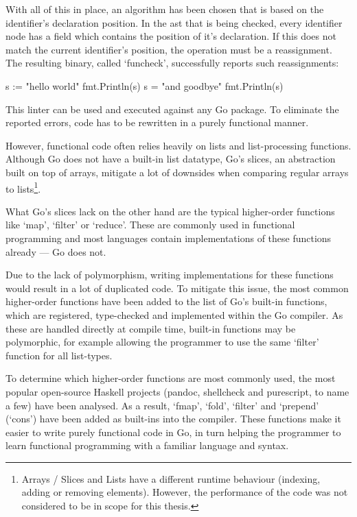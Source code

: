 With all of this in place, an algorithm has been chosen that is based on the identifier's
declaration position. In the \gls{ast} that is being checked, every identifier node has a field
which contains the position of it's declaration. If this does not match the current identifier's
position, the operation must be a reassignment.
The resulting binary, called `funcheck', successfully reports such reassignments:

\begin{gocode}
s := "hello world"
fmt.Println(s)
s = "and goodbye"
fmt.Println(s)
\end{gocode}


This linter can be used and executed against any Go package. To eliminate the reported errors,
code has to be rewritten in a purely functional manner.

However, functional code often relies heavily on lists and list-processing functions.
Although Go does not have a built-in list datatype, Go's slices, an abstraction built
on top of arrays,
mitigate a lot of downsides when comparing regular arrays to lists\footnote{Arrays / Slices
and Lists have a different runtime behaviour (indexing, adding or removing elements).
However, the performance of the code was not considered to be in scope for this thesis.}.

What Go's slices lack on the other hand are the typical higher-order functions like `map',
`filter' or `reduce'. These are commonly used in functional programming and most languages
contain implementations of these functions already --- Go does not.

Due to the lack of polymorphism, writing implementations for these functions
would result in a lot of duplicated code. To mitigate this issue, the most
common higher-order functions have been added to the list of Go's built-in functions,
which are registered, type-checked and implemented within the Go compiler.
As these are handled directly at compile time, built-in functions may be polymorphic, for
example allowing the programmer to use the same `filter' function for all list-types.

To determine which higher-order functions are most commonly used, the most popular
open-source Haskell projects (pandoc, shellcheck and purescript, to name a few) have
been analysed. As a result, `fmap', `fold', `filter' and `prepend'
(`cons') have been added as built-ins into the compiler.
These functions make it easier to write purely functional code in Go, in turn helping
the programmer to learn functional programming with a familiar language and syntax.

